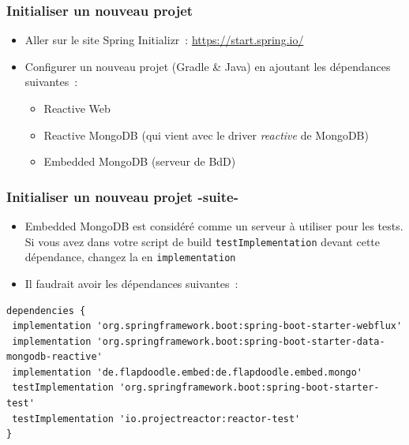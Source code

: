 \documentclass{beamer}
\newcounter{ctr1}
\begin{document}
\begin{frame}[fragile]
	\frametitle{Initialiser un nouveau projet}
	\begin{itemize}
		\item Aller sur le site Spring Initializr~:
		\url{https://start.spring.io/}
		\item Configurer un nouveau projet (Gradle \& Java) en ajoutant les dépendances suivantes~:
		\begin{itemize}
			\item Reactive Web
			\item Reactive MongoDB (qui vient avec le driver \textit{reactive} de MongoDB)
			\item Embedded MongoDB (serveur de BdD)
		\end{itemize}
	\end{itemize}
\end{frame}

\begin{frame}[fragile]
	\frametitle{Initialiser un nouveau projet -suite-}
	\begin{itemize}
	\item Embedded MongoDB est considéré comme un serveur à utiliser pour les tests. Si vous avez dans votre script de build \texttt{testImplementation} devant cette dépendance, changez la en \texttt{implementation}
	\item Il faudrait avoir les dépendances suivantes~:
	\end{itemize}
\begin{lstlisting}
dependencies {
 implementation 'org.springframework.boot:spring-boot-starter-webflux'	
 implementation 'org.springframework.boot:spring-boot-starter-data-mongodb-reactive'
 implementation 'de.flapdoodle.embed:de.flapdoodle.embed.mongo'
 testImplementation 'org.springframework.boot:spring-boot-starter-test'
 testImplementation 'io.projectreactor:reactor-test'
}
\end{lstlisting}
\end{frame}
\end{document}
